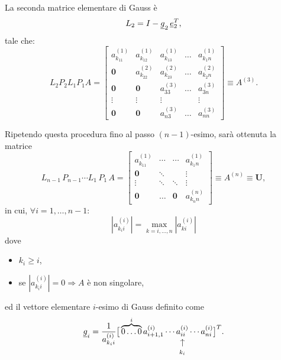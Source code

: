 La seconda matrice elementare di Gauss è
\begin{equation*}
    L_2 = I - \uline g_2\, \uline e_2^T,
\end{equation*}
tale che:
\begin{equation*}
    L_2 P_2 L_1 P_1 A = 
    \begin{bmatrix}
        a_{k_11}^{(1)} & a_{k_12}^{(1)} & a_{k_13}^{(1)} & \hdots & a_{k_1n}^{(1)}\\
        \boldsymbol 0 & a_{k_22}^{(2)} & a_{k_23}^{(2)} & \hdots & a_{k_2n}^{(2)}\\
        \boldsymbol 0 & \boldsymbol 0 & a_{33}^{(3)} & \hdots & a_{3n}^{(3)}\\
        \boldsymbol\vdots & \boldsymbol\vdots & \vdots & &\vdots\\
        \boldsymbol 0 & \boldsymbol 0 & a_{n3}^{(3)} & \hdots & a_{nn}^{(3)}
    \end{bmatrix}\equiv A^{(3)}.
\end{equation*}

Ripetendo questa procedura fino al passo $(n-1)$-esimo, sarà ottenuta la matrice
\begin{equation}\label{eq:Uperm}
    L_{n-1}\, P_{n-1} \cdots L_1\, P_1\, A = 
    \begin{bmatrix}
        a_{k_11}^{(1)} & \cdots & \cdots & a_{k_1n}^{(1)}\\
        \boldsymbol 0 & \ddots & & \vdots\\
        \boldsymbol\vdots & \boldsymbol\ddots &\ddots &\vdots\\
        \boldsymbol 0 & \boldsymbol\hdots & \boldsymbol 0 & a_{k_nn}^{(n)}
    \end{bmatrix}\equiv A^{(n)}\equiv \boldsymbol U,
\end{equation}
in cui, $\forall i=1,\hdots, n-1:$
\begin{equation*}
    \left|a_{k_ii}^{(i)}\right|=\underset{k=i,\hdots, n}{\max}\left|a_{ki}^{(i)}\right|
\end{equation*}
dove
\begin{itemize}
    \item $k_i\geq i$,
    \item se $\left|a_{k_i i}^{(i)}\right|=0\Rightarrow A$ è non singolare,
\end{itemize}
ed il vettore elementare $i$-esimo di Gauss definito come
\begin{equation*}
    \uline g_i=\frac{1}{a_{k_ii}^{(i)}}\big[\overbrace{0\hdots 0}^{i}a_{i+1, 1}^{(i)}\cdots \vrightarrowup{a_{ii}^{(i)}}{k_i}\cdots a_{ni}^{(i)}\big]^T.
\end{equation*}

